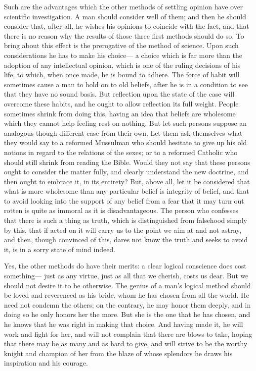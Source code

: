 \documentclass[]{article}
\begin{document}
Such are the advantages which the other methods of settling opinion have over scientific investigation. A man should consider well of them; and then he should consider that, after all, he wishes his opinions to coincide with the fact, and that there is no reason why the results of those three first methods should do so. To bring about this effect is the prerogative of the method of science. Upon such considerations he has to make his choice--- a choice which is far more than the adoption of any intellectual opinion, which is one of the ruling decisions of his life, to which, when once made, he is bound to adhere. The force of habit will sometimes cause a man to hold on to old beliefs, after he is in a condition to see that they have no sound basis. But reflection upon the state of the case will overcome these habits, and he ought to allow reflection its full weight. People sometimes shrink from doing this, having an idea that beliefs are wholesome which they cannot help feeling rest on nothing. But let such persons suppose an analogous though different case from their own. Let them ask themselves what they would say to a reformed Mussulman who should hesitate to give up his old notions in regard to the relations of the sexes; or to a reformed Catholic who should still shrink from reading the Bible. Would they not say that these persons ought to consider the matter fully, and clearly understand the new doctrine, and then ought to embrace it, in its entirety? But, above all, let it be considered that what is more wholesome than any particular belief is integrity of belief, and that to avoid looking into the support of any belief from a fear that it may turn out rotten is quite as immoral as it is disadvantageous. The person who confesses that there is such a thing as truth, which is distinguished from falsehood simply by this, that if acted on it will carry us to the point we aim at and not astray, and then, though convinced of this, dares not know the truth and seeks to avoid it, is in a sorry state of mind indeed.

Yes, the other methods do have their merits: a clear logical conscience does cost something--- just as any virtue, just as all that we cherish, costs us dear. But we should not desire it to be otherwise.  The genius of a man's logical method should be loved and reverenced as his bride, whom he has chosen from all the world.  He need not condemn the others; on the contrary, he may honor them deeply, and in doing so he only honors her the more.  But she is the one that he has chosen, and he knows that he was right in making that choice.  And having made it, he will work and fight for her, and will not complain that there are blows to take, hoping that there may be as many and as hard to give, and will strive to be the worthy knight and champion of her from the blaze of whose splendors he draws his inspiration and his courage.
\end{document}

